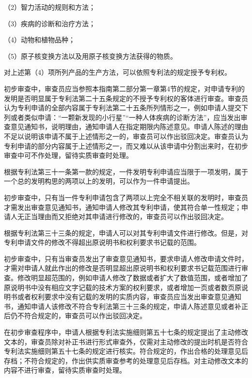 {\setlength{\parindent}{17.1bp}（2）智力活动的规则和方法；\par}

{\setlength{\parindent}{17.1bp}（3）疾病的诊断和治疗方法；\par}

{\setlength{\parindent}{17.1bp}（4）动物和植物品种；\par}

{\setlength{\parindent}{17.1bp}（5）原子核变换方法以及用原子核变换方法获得的物质。\par}

对上述第（4）项所列产品的生产方法，可以依照专利法的规定授予专利权。

初步审查中，审查员应当参照本指南第二部分第一章第4节的规定，对申请专利的发明是否明显属于专利法第二十五条规定的不授予专利权的客体进行审查。审查员认为专利申请的全部内容属于专利法第二十五条所列情形之一，例如申请人提交下列或者类似申请：“一颗新发现的小行星”“一种人体疾病的诊断方法”，应当发出审查意见通知书，说明理由，通知申请人在指定期限内陈述意见。申请人陈述的理由不足以说明该申请不属于上述情形之一的，审查员可以作出驳回决定。审查员认为专利申请的部分内容属于上述情形之一，而又难以从该申请中分割出来时，在初步审查中可不作处理，留待实质审查时处理。

根据专利法第三十一条第一款的规定，一件发明专利申请应当限于一项发明，属于一个总的发明构思的两项以上的发明，可以作为一件申请提出。

初步审查中，只有当一件专利申请包含了两项以上完全不相关联的发明时，审查员才需发出审查意见通知书，通知申请人修改其专利申请，使其符合单一性规定；申请人无正当理由而又拒绝对其申请进行修改的，审查员可以作出驳回决定。

根据专利法第三十三条的规定，申请人可以对其专利申请文件进行修改。但是，对专利申请文件的修改不得超出原说明书和权利要求书记载的范围。

初步审查中，只有当审查员发出了审查意见通知书，要求申请人修改申请文件时，才需对申请人就此作出的修改是否明显超出原说明书和权利要求书记载范围进行审查。修改明显超范围的，例如申请人修改了数据或者扩大了数值范围，或者增加了原说明书中没有相应文字记载的技术方案的权利要求，或者增加一页或者数页原说明书或者权利要求中没有记载的发明的实质内容，审查员应当发出审查意见通知书，通知申请人该修改不符合专利法第三十三条的规定，申请人陈述意见或者补正后仍不符合规定的，审查员可以作出驳回决定。

{\setlength{\parindent}{22.2bp}在初步审查程序中，申请人根据专利法实施细则第五十七条的规定提出了主动修改文本的，审查员除对补正书进行形式审查外，仅需对主动修改的提出时机是否符合专利法实施细则第五十七条的规定进行核实。符合规定的，作出合格的处理意见后存档；不符合规定的，作出供实质审查参考的处理意见后存档。对主动修改文本的内容不进行审查，留待实质审查时处理。\par}

